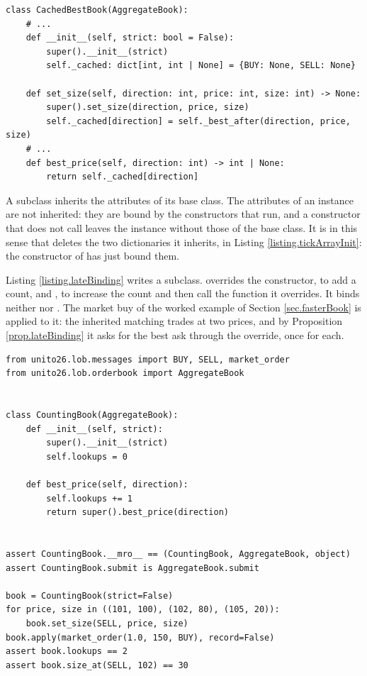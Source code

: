 \begin{lstlisting}[caption={\protect\codehl{unito26.lob.orderbook.CachedBestBook}, abridged: the constructor and the two overrides.}, label=listing.cachedBestBook]
class CachedBestBook(AggregateBook):
    # ...
    def __init__(self, strict: bool = False):
        super().__init__(strict)
        self._cached: dict[int, int | None] = {BUY: None, SELL: None}

    def set_size(self, direction: int, price: int, size: int) -> None:
        super().set_size(direction, price, size)
        self._cached[direction] = self._best_after(direction, price, size)
    # ...
    def best_price(self, direction: int) -> int | None:
        return self._cached[direction]
\end{lstlisting}

\begin{remark}\label{remark.constructorsBindTheState}
 A subclass inherits the attributes of its base class.
 The attributes of an instance are not inherited:
 they are bound by the constructors that run,
 and a constructor that does not call 
 leaves the instance without those of the base class.
 It is in this sense that  deletes the two dictionaries it inherits,
 in Listing \ref{listing.tickArrayInit}:
 the constructor of  has just bound them.
\end{remark}

Listing \ref{listing.lateBinding} writes a subclass.
 overrides the constructor, to add a count,
and , to increase the count and then call the function it overrides.
It binds neither  nor .
The market buy of the worked example of Section \ref{sec.fasterBook} is applied to it:
the inherited matching trades at two prices,
and by Proposition \ref{prop.lateBinding} it asks for the best ask through the override,
once for each.

\begin{lstlisting}[caption={An inherited method calls the function that the subclass overrides.}, label=listing.lateBinding]
from unito26.lob.messages import BUY, SELL, market_order
from unito26.lob.orderbook import AggregateBook


class CountingBook(AggregateBook):
    def __init__(self, strict):
        super().__init__(strict)
        self.lookups = 0

    def best_price(self, direction):
        self.lookups += 1
        return super().best_price(direction)


assert CountingBook.__mro__ == (CountingBook, AggregateBook, object)
assert CountingBook.submit is AggregateBook.submit

book = CountingBook(strict=False)
for price, size in ((101, 100), (102, 80), (105, 20)):
    book.set_size(SELL, price, size)
book.apply(market_order(1.0, 150, BUY), record=False)
assert book.lookups == 2
assert book.size_at(SELL, 102) == 30
\end{lstlisting}

